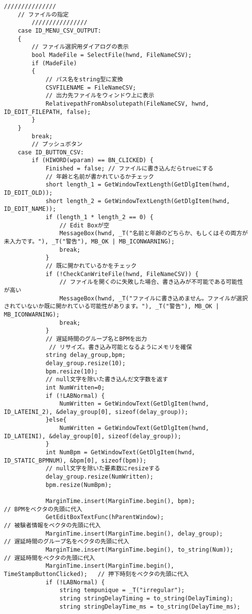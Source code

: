 \begin{lstlisting}[caption=main.cpp]
		///////////////
	// ファイルの指定
		////////////////
	case ID_MENU_CSV_OUTPUT:
	{
		// ファイル選択用ダイアログの表示
		bool MadeFile = SelectFile(hwnd, FileNameCSV);
		if (MadeFile)
		{
			// パス名をstring型に変換
			CSVFILENAME = FileNameCSV;
			// 出力先ファイルをウィンドウ上に表示
			RelativepathFromAbsolutepath(FileNameCSV, hwnd, ID_EDIT_FILEPATH, false);
		}
	}
		break;
		// プッシュボタン
	case ID_BUTTON_CSV:
		if (HIWORD(wparam) == BN_CLICKED) {
			Finished = false; // ファイルに書き込んだらtrueにする
			// 年齢と名前が書かれているかチェック
			short length_1 = GetWindowTextLength(GetDlgItem(hwnd, ID_EDIT_OLD));
			short length_2 = GetWindowTextLength(GetDlgItem(hwnd, ID_EDIT_NAME));
			if (length_1 * length_2 == 0) {
				// Edit Boxが空
				MessageBox(hwnd, _T("名前と年齢のどちらか、もしくはその両方が未入力です。"), _T("警告"), MB_OK | MB_ICONWARNING);
				break;
			}
			// 既に開かれているかをチェック
			if (!CheckCanWriteFile(hwnd, FileNameCSV)) {
				// ファイルを開くのに失敗した場合、書き込みが不可能である可能性が高い
				MessageBox(hwnd, _T("ファイルに書き込めません。ファイルが選択されていないか既に開かれている可能性があります。"), _T("警告"), MB_OK | MB_ICONWARNING);
				break;
			}
			// 遅延時間のグループ名とBPMを出力
			 // リサイズ。書き込み可能となるようにメモリを確保
			string delay_group,bpm;
			delay_group.resize(10);  
			bpm.resize(10);
			// null文字を除いた書き込んだ文字数を返す
			int NumWritten=0;
			if (!LABNormal) {
				NumWritten = GetWindowText(GetDlgItem(hwnd, ID_LATEINI_2), &delay_group[0], sizeof(delay_group));
			}else{
				NumWritten = GetWindowText(GetDlgItem(hwnd, ID_LATEINI), &delay_group[0], sizeof(delay_group));
			}
			int NumBpm = GetWindowText(GetDlgItem(hwnd, ID_STATIC_BPMNUM), &bpm[0], sizeof(bpm));
			// null文字を除いた要素数にresizeする
			delay_group.resize(NumWritten);       
			bpm.resize(NumBpm);
			
			MarginTime.insert(MarginTime.begin(), bpm);                                // BPMをベクタの先頭に代入
			GetEditBoxTextFunc(hParentWindow);                                            // 被験者情報をベクタの先頭に代入
			MarginTime.insert(MarginTime.begin(), delay_group);                     // 遅延時間のグループ名をベクタの先頭に代入
			MarginTime.insert(MarginTime.begin(), to_string(Num));                 // 遅延時間をベクタの先頭に代入
			MarginTime.insert(MarginTime.begin(), TimeStampButtonClicked);   // 押下時刻をベクタの先頭に代入
			if (!LABNormal) {
				string tempunique = _T("irregular");
				string stringDelayTiming = to_string(DelayTiming);
				string stringDelayTime_ms = to_string(DelayTime_ms);


\end{lstlisting}

